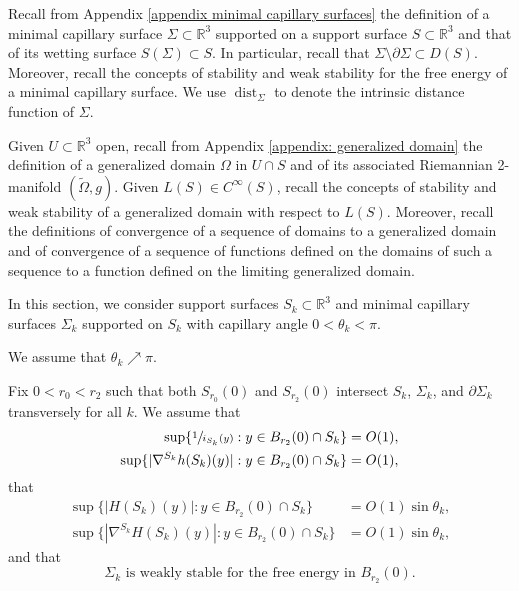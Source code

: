 \documentclass[11pt]{amsart}
\begin{document}
Recall from Appendix \ref{appendix minimal capillary surfaces}  the  definition of a minimal capillary surface $\Sigma \subset \mathbb{R}^3$ supported on a support surface $S\subset \mathbb{R}^3$  and that of its  wetting surface $S(\Sigma)\subset S$. In particular, recall that  $\Sigma\setminus \partial \Sigma \subset D(S)$.  Moreover, recall the concepts of  stability and weak stability for the free energy  of a minimal capillary surface. We use $\operatorname{dist}_\Sigma$ to denote the intrinsic distance function of $\Sigma$. 

Given $U\subset \mathbb{R}^3$ open, recall from Appendix \ref{appendix: generalized domain} the definition of a generalized domain $\Omega$ in $U\cap S$ and of its associated Riemannian 2-manifold $(\tilde \Omega,g)$. Given $L(S)\in C^\infty(S)$, recall the concepts of  stability and weak stability of a generalized domain  with respect to $L(S)$.  Moreover, recall the definitions of convergence of a sequence of domains to a generalized domain and of convergence of a sequence of functions defined on the domains of such a sequence to a function defined on the limiting generalized domain.



 

In this section,  we consider   support surfaces $S_k\subset \mathbb{R}^3$ and minimal capillary surfaces $\Sigma_k$ supported on $S_k$ with capillary angle $0<\theta_k<\pi$.



We assume that $\theta_k\nearrow  \pi$.

	Fix $0<r_0<r_2$ such that both  $S_{r_0}(0)$ and $S_{r_2}(0)$  intersect  $S_k$, $\Sigma_k$, and $\partial \Sigma_k$ transversely for all $k$. We assume that
	\begin{equation} 
\begin{aligned} \label{geometry bound S3} 
	\sup\{\sfrac1{i_{S_k}(y)}:y\in B_{r_2}(0)\cap S_k\}&=O(1),\\
	\sup\{|\nabla^{S_k}h(S_k)(y)|:y\in B_{r_2}(0)\cap S_k\}&=O(1),
\end{aligned} 
\end{equation} 
that
\begin{equation} \label{MC bound S3} 
	\begin{aligned}
		\sup\{|H(S_k)(y)|:y\in B_{r_2}(0)\cap S_k\}&=O(1)\sin\theta_k,
		\\  \sup\{|\nabla^{S_k}H(S_k)(y)|:y\in B_{r_2}(0)\cap S_k\}&=O(1)\sin\theta_k,
	\end{aligned} 
\end{equation} 
and that 
$$\text{$\Sigma_k$ is weakly stable for the free energy in $B_{r_2}(0)$}.$$
\end{document}
